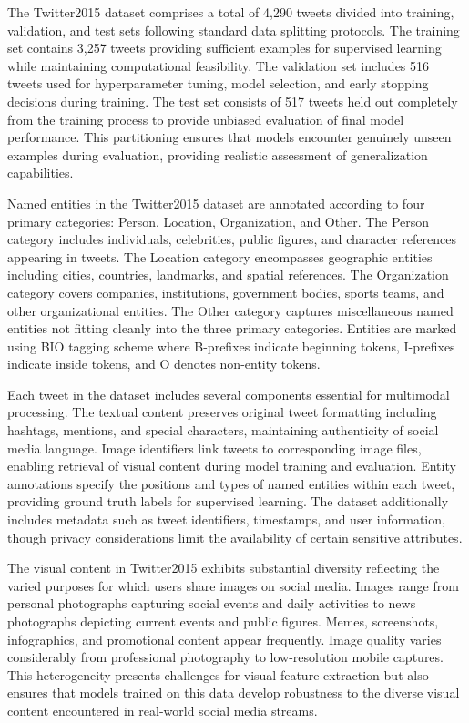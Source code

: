 \documentclass[12pt,a4paper]{report}
\begin{document}
The Twitter2015 dataset comprises a total of 4,290 tweets divided into training, validation, and test sets following standard data splitting protocols. The training set contains 3,257 tweets providing sufficient examples for supervised learning while maintaining computational feasibility. The validation set includes 516 tweets used for hyperparameter tuning, model selection, and early stopping decisions during training. The test set consists of 517 tweets held out completely from the training process to provide unbiased evaluation of final model performance. This partitioning ensures that models encounter genuinely unseen examples during evaluation, providing realistic assessment of generalization capabilities.

Named entities in the Twitter2015 dataset are annotated according to four primary categories: Person, Location, Organization, and Other. The Person category includes individuals, celebrities, public figures, and character references appearing in tweets. The Location category encompasses geographic entities including cities, countries, landmarks, and spatial references. The Organization category covers companies, institutions, government bodies, sports teams, and other organizational entities. The Other category captures miscellaneous named entities not fitting cleanly into the three primary categories. Entities are marked using BIO tagging scheme where B-prefixes indicate beginning tokens, I-prefixes indicate inside tokens, and O denotes non-entity tokens.

Each tweet in the dataset includes several components essential for multimodal processing. The textual content preserves original tweet formatting including hashtags, mentions, and special characters, maintaining authenticity of social media language. Image identifiers link tweets to corresponding image files, enabling retrieval of visual content during model training and evaluation. Entity annotations specify the positions and types of named entities within each tweet, providing ground truth labels for supervised learning. The dataset additionally includes metadata such as tweet identifiers, timestamps, and user information, though privacy considerations limit the availability of certain sensitive attributes.

The visual content in Twitter2015 exhibits substantial diversity reflecting the varied purposes for which users share images on social media. Images range from personal photographs capturing social events and daily activities to news photographs depicting current events and public figures. Memes, screenshots, infographics, and promotional content appear frequently. Image quality varies considerably from professional photography to low-resolution mobile captures. This heterogeneity presents challenges for visual feature extraction but also ensures that models trained on this data develop robustness to the diverse visual content encountered in real-world social media streams.
\end{document}
